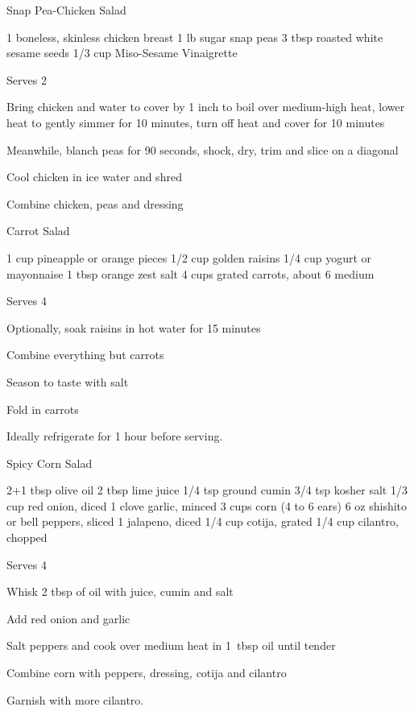 \begin{recipe}{Snap Pea-Chicken Salad}{}
\begin{ingredients}
1 boneless, skinless chicken breast
1 lb sugar snap peas
3 tbsp roasted white sesame seeds
1/3 cup Miso-Sesame Vinaigrette
\end{ingredients}
\nextcolumn
Serves 2
\begin{steps}
    \item Bring chicken and water to cover by 1 inch to boil over medium-high heat, lower heat to gently simmer for 10 minutes, turn off heat and cover for 10 minutes
    \item Meanwhile, blanch peas for 90 seconds, shock, dry, trim and slice on a diagonal
    \item Cool chicken in ice water and shred
    \item Combine chicken, peas and dressing
\end{steps}
\end{recipe}

\begin{recipe}{Carrot Salad}{}
\begin{ingredients}
1 cup pineapple or orange pieces
1/2 cup golden raisins
1/4 cup yogurt or mayonnaise
1 tbsp orange zest
salt
4 cups grated carrots, about 6 medium
\end{ingredients}
\nextcolumn
Serves 4
\begin{steps}
    \item Optionally, soak raisins in hot water for 15 minutes
    \item Combine everything but carrots
    \item Season to taste with salt
    \item Fold in carrots
\end{steps}
Ideally refrigerate for 1 hour before serving.
\end{recipe}

\begin{denserecipe}{Spicy Corn Salad}{}
\begin{ingredients}
2+1 tbsp olive oil
2 tbsp lime juice
1/4 tsp ground cumin
3/4 tsp kosher salt
1/3 cup red onion, diced
1 clove garlic, minced
3 cups corn (4 to 6 ears)
6 oz shishito or bell peppers, sliced
1 jalapeno, diced
1/4 cup cotija, grated
1/4 cup cilantro, chopped
\end{ingredients}
\nextcolumn
Serves 4
\begin{steps}
    \item Whisk 2 tbsp of oil with juice, cumin and salt
    \item Add red onion and garlic
    \item Salt peppers and cook over medium heat in 1~tbsp oil until tender
    \item Combine corn with peppers, dressing, cotija and cilantro
\end{steps}
Garnish with more cilantro.
\end{denserecipe}

